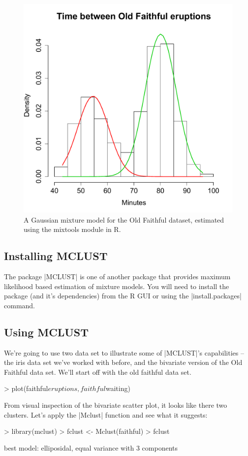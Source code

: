 \begin{figure}[!ht]
    \centering
    \includegraphics[width=0.5\columnwidth]{./figures/hands-on10/faithful-R.pdf}
    \caption{A Gaussian mixture model for the Old Faithful dataset, estimated using the mixtools module in R.}\label{fig:faithfulR}
\end{figure}


\subsection{Installing MCLUST}
The package |MCLUST| is one of another package that provides maximum likelihood based estimation of mixture models.  You will need to install the package (and it's dependencies) from the R GUI or using the |install.packages| command.

\subsection{Using MCLUST}

We're going to use two data set to illustrate some of |MCLUST|'s capabilities -- the iris data set we've worked with before, and the bivariate version of the Old Faithful data set. We'll start off with  the old faithful data set.

\begin{R}
> plot(faithful$eruptions, faithful$waiting)
\end{R}

From visual inspection of the bivariate scatter plot, it looks like there two clusters. Let's apply the |Mclust| function and see what it suggests:

\begin{R}
> library(mclust)
> fclust <- Mclust(faithful)
> fclust

 best model: elliposidal, equal variance with 3 components
\end{R}

